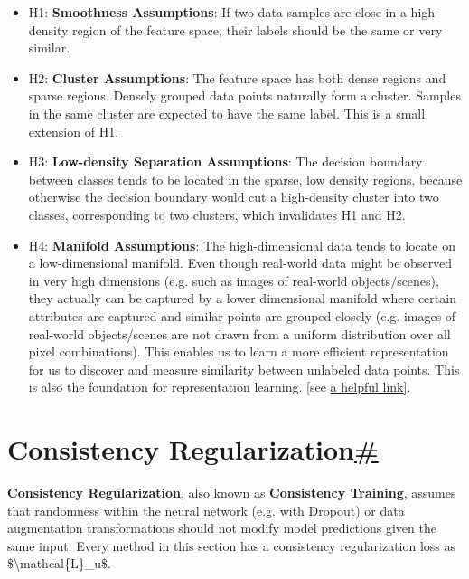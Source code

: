 \begin{itemize}
\item
  H1: \textbf{Smoothness Assumptions}: If two data samples are close in a high-density region of the feature space, their labels should be the same or very similar.
\item
  H2: \textbf{Cluster Assumptions}: The feature space has both dense regions and sparse regions. Densely grouped data points naturally form a cluster. Samples in the same cluster are expected to have the same label. This is a small extension of H1.
\item
  H3: \textbf{Low-density Separation Assumptions}: The decision boundary between classes tends to be located in the sparse, low density regions, because otherwise the decision boundary would cut a high-density cluster into two classes, corresponding to two clusters, which invalidates H1 and H2.
\item
  H4: \textbf{Manifold Assumptions}: The high-dimensional data tends to locate on a low-dimensional manifold. Even though real-world data might be observed in very high dimensions (e.g. such as images of real-world objects/scenes), they actually can be captured by a lower dimensional manifold where certain attributes are captured and similar points are grouped closely (e.g. images of real-world objects/scenes are not drawn from a uniform distribution over all pixel combinations). This enables us to learn a more efficient representation for us to discover and measure similarity between unlabeled data points. This is also the foundation for representation learning. {[}see \href{https://stats.stackexchange.com/questions/66939/what-is-the-manifold-assumption-in-semi-supervised-learning}{a helpful link}{]}.
\end{itemize}

\section{\texorpdfstring{Consistency Regularization\hyperref[consistency-regularization]{\#}}{Consistency Regularization\#}}\label{consistency-regularization}

\textbf{Consistency Regularization}, also known as \textbf{Consistency Training}, assumes that randomness within the neural network (e.g. with Dropout) or data augmentation transformations should not modify model predictions given the same input. Every method in this section has a consistency regularization loss as \$\textbackslash mathcal\{L\}\_u\$.

